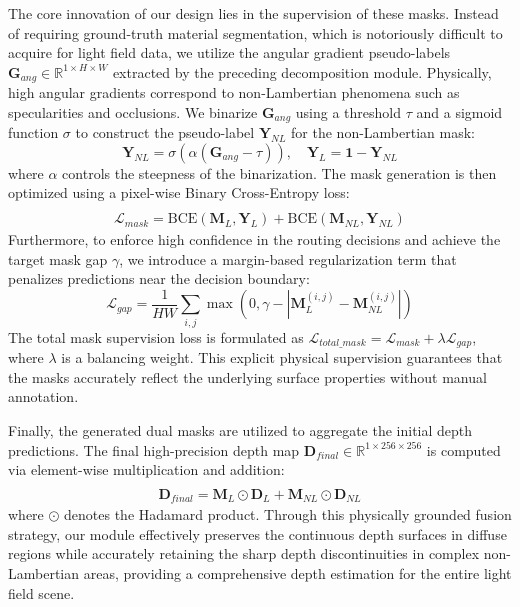 \documentclass[lettersize,journal]{IEEEtran}
\begin{document}
The core innovation of our design lies in the supervision of these masks. Instead of requiring ground-truth material segmentation, which is notoriously difficult to acquire for light field data, we utilize the angular gradient pseudo-labels $\mathbf{G}_{ang} \in \mathbb{R}^{1 \times H \times W}$ extracted by the preceding decomposition module. Physically, high angular gradients correspond to non-Lambertian phenomena such as specularities and occlusions. We binarize $\mathbf{G}_{ang}$ using a threshold $\tau$ and a sigmoid function $\sigma$ to construct the pseudo-label $\mathbf{Y}_{NL}$ for the non-Lambertian mask:
\begin{equation}
\mathbf{Y}_{NL} = \sigma(\alpha (\mathbf{G}_{ang} - \tau)), \quad \mathbf{Y}_L = \mathbf{1} - \mathbf{Y}_{NL}
\label{eq:ch3_19}
\end{equation}
where $\alpha$ controls the steepness of the binarization. The mask generation is then optimized using a pixel-wise Binary Cross-Entropy loss:
\begin{multline}
 \\
\mathcal{L}_{mask} = \text{BCE}(\mathbf{M}_L, \mathbf{Y}_L) + \text{BCE}(\mathbf{M}_{NL}, \mathbf{Y}_{NL})
\label{eq:ch3_20}
\end{multline}
Furthermore, to enforce high confidence in the routing decisions and achieve the target mask gap $\gamma$, we introduce a margin-based regularization term that penalizes predictions near the decision boundary:
\begin{equation}
\mathcal{L}_{gap} = \frac{1}{HW} \sum_{i,j} \max(0, \gamma - |\mathbf{M}_L^{(i,j)} - \mathbf{M}_{NL}^{(i,j)}|)
\label{eq:ch3_21}
\end{equation}
The total mask supervision loss is formulated as $\mathcal{L}_{total\_mask} = \mathcal{L}_{mask} + \lambda \mathcal{L}_{gap}$, where $\lambda$ is a balancing weight. This explicit physical supervision guarantees that the masks accurately reflect the underlying surface properties without manual annotation.

Finally, the generated dual masks are utilized to aggregate the initial depth predictions. The final high-precision depth map $\mathbf{D}_{final} \in \mathbb{R}^{1 \times 256 \times 256}$ is computed via element-wise multiplication and addition:
\begin{multline}
 \\
\mathbf{D}_{final} = \mathbf{M}_L \odot \mathbf{D}_L + \mathbf{M}_{NL} \odot \mathbf{D}_{NL}
\label{eq:ch3_22}
\end{multline}
where $\odot$ denotes the Hadamard product. Through this physically grounded fusion strategy, our module effectively preserves the continuous depth surfaces in diffuse regions while accurately retaining the sharp depth discontinuities in complex non-Lambertian areas, providing a comprehensive depth estimation for the entire light field scene.
\end{document}

